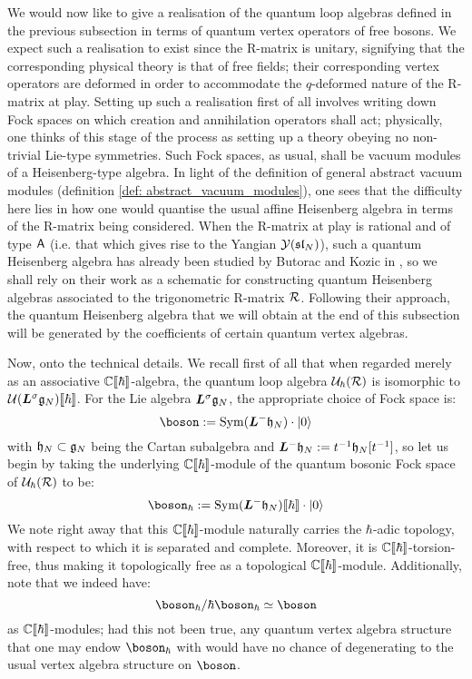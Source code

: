         We would now like to give a realisation of the quantum loop algebras defined in the previous subsection in terms of quantum vertex operators of free bosons. We expect such a realisation to exist since the R-matrix is unitary, signifying that the corresponding physical theory is that of free fields; their corresponding vertex operators are deformed in order to accommodate the $q$-deformed nature of the R-matrix at play. Setting up such a realisation first of all involves writing down Fock spaces on which creation and annihilation operators shall act; physically, one thinks of this stage of the process as setting up a theory obeying no non-trivial Lie-type symmetries. Such Fock spaces, as usual, shall be vacuum modules of a Heisenberg-type algebra. In light of the definition of general abstract vacuum modules (definition \ref{def: abstract_vacuum_modules}), one sees that the difficulty here lies in how one would quantise the usual affine Heisenberg algebra in terms of the R-matrix being considered. When the R-matrix at play is rational and of type $\mathsf{A}$ (i.e. that which gives rise to the Yangian $\mathcal{Y}(\mathfrak{sl}_N)$), such a quantum Heisenberg algebra has already been studied by Butorac and Kozic in \cite{butorac_kozic_quantum_heisenberg_algebras_associated_with_type_A_rational_R_matrices}, so we shall rely on their work as a schematic for constructing quantum Heisenberg algebras associated to the trigonometric R-matrix $\mathcal{R}$. Following their approach, the quantum Heisenberg algebra that we will obtain at the end of this subsection will be generated by the coefficients of certain quantum vertex algebras.

        Now, onto the technical details. We recall first of all that when regarded merely as an associative $\mathbb{C}[\![\hbar]\!]$-algebra, the quantum loop algebra $\mathcal{U}_{\hbar}(\mathcal{R})$ is isomorphic to $\mathcal{U}(\boldsymbol{L}^{\sigma}\mathfrak{g}_N)[\![\hbar]\!]$. For the Lie algebra $\boldsymbol{L}^{\sigma}\mathfrak{g}_N$, the appropriate choice of Fock space is:
            $$\boson := \Sym( \Loop^- \h_N ) \cdot \ket{0}$$
        with $\mathfrak{h}_N \subset \mathfrak{g}_N$ being the Cartan subalgebra and $\boldsymbol{L}^- \mathfrak{h}_N := t^{-1} \mathfrak{h}_N[t^{-1}]$, so let us begin by taking the underlying $\mathbb{C}[\![\hbar]\!]$-module of the quantum bosonic Fock space of $\mathcal{U}_{\hbar}(\mathcal{R})$ to be:
            $$\boson_{\hbar} := \Sym( \Loop^- \h_N )[\![\hbar]\!] \cdot \ket{0}$$
        We note right away that this $\mathbb{C}[\![\hbar]\!]$-module naturally carries the $\hbar$-adic topology, with respect to which it is separated and complete. Moreover, it is $\mathbb{C}[\![\hbar]\!]$-torsion-free, thus making it topologically free as a topological $\mathbb{C}[\![\hbar]\!]$-module. Additionally, note that we indeed have:
            $$\boson_{\hbar}/\hbar \boson_{\hbar} \cong \boson$$
        as $\mathbb{C}[\![\hbar]\!]$-modules; had this not been true, any quantum vertex algebra structure that one may endow $\boson_{\hbar}$ with would have no chance of degenerating to the usual vertex algebra structure on $\boson$.

